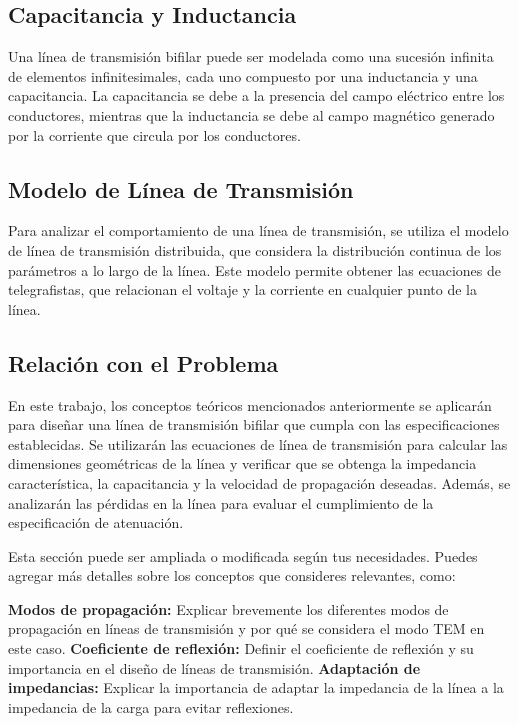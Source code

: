 \subsection{Capacitancia y Inductancia}

Una línea de transmisión bifilar puede ser modelada como una sucesión infinita de elementos infinitesimales, cada uno compuesto por una inductancia y una capacitancia. La capacitancia se debe a la presencia del campo eléctrico entre los conductores, mientras que la inductancia se debe al campo magnético generado por la corriente que circula por los conductores.

\subsection{Modelo de Línea de Transmisión}

Para analizar el comportamiento de una línea de transmisión, se utiliza el modelo de línea de transmisión distribuida, que considera la distribución continua de los parámetros a lo largo de la línea. Este modelo permite obtener las ecuaciones de telegrafistas, que relacionan el voltaje y la corriente en cualquier punto de la línea.

\subsection{Relación con el Problema}

En este trabajo, los conceptos teóricos mencionados anteriormente se aplicarán para diseñar una línea de transmisión bifilar que cumpla con las especificaciones establecidas. Se utilizarán las ecuaciones de línea de transmisión para calcular las dimensiones geométricas de la línea y verificar que se obtenga la impedancia característica, la capacitancia y la velocidad de propagación deseadas. Además, se analizarán las pérdidas en la línea para evaluar el cumplimiento de la especificación de atenuación.

Esta sección puede ser ampliada o modificada según tus necesidades. Puedes agregar más detalles sobre los conceptos que consideres relevantes, como:

\textbf{Modos de propagación:} Explicar brevemente los diferentes modos de propagación en líneas de transmisión y por qué se considera el modo TEM en este caso.
\textbf{Coeficiente de reflexión:} Definir el coeficiente de reflexión y su importancia en el diseño de líneas de transmisión.
\textbf{Adaptación de impedancias:} Explicar la importancia de adaptar la impedancia de la línea a la impedancia de la carga para evitar reflexiones.

\pagebreak
